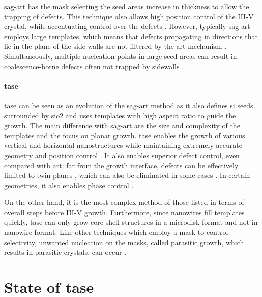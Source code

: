 \acs{sag}-\acs{art} has the mask selecting the seed areas increase in thickness to allow the trapping of defects. This technique also allows high position control of the III-V crystal, while accentuating control over the defects \cite{Han2016, Han2016_2}. However, typically \acs{sag}-\acs{art} employs large templates, which means that defects propagating in directions that lie in the plane of the side walls are not filtered by the \acs{art} mechanism \cite{Kunert2018}. Simultaneously, multiple nucleation points in large seed areas can result in coalescence-borne defects often not trapped by sidewalls \cite{Kunert2016}.
\par
\paragraph{\Acf{tase}} \acs{tase} can be seen as an evolution of the \acs{sag}-\acs{art} method as it also defines \acl{si} seeds surrounded by \acs{sio2} and uses templates with high aspect ratio to guide the growth. The main difference with \acs{sag}-\acs{art} are the size and complexity of the templates and the focus on planar growth. \acs{tase} enables the growth of various vertical and horizontal nanostructures while maintaining extremely accurate geometry and position control \cite{Ritter2021, Tiwari2020, Schmid2015}. It also enables superior defect control, even compared with \acs{art}: far from the growth interface, defects can be effectively limited to twin planes \cite{Han2020}, which can also be eliminated in some cases \cite{Knoedler2017}. In certain geometries, it also enables phase control \cite{Staudinger2018}. 

On the other hand, it is the most complex method of those listed in terms of overall steps before III-V growth. Furthermore, since nanowires fill templates quickly, \acs{tase} can only grow core-shell structures in a microdisk format \cite{Tiwari2020} and not in nanowire format. Like other techniques which employ a mask to control selectivity, unwanted nucleation on the masks, called parasitic growth, which results in parasitic crystals, can occur \cite{Goswami2021}.
\par

\section{\texorpdfstring{State of \acl{tase}}{State of template assisted selective epitaxy}}

